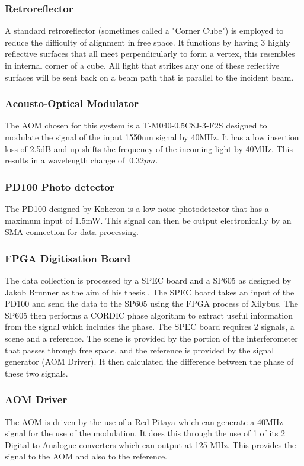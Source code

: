\documentclass[12pt,a4paper,oneside]{report}
\begin{document}
\subsubsection{Retroreflector}
A standard retroreflector (sometimes called a "Corner Cube") is employed to reduce the difficulty of alignment in free space. It functions by having 3 highly reflective surfaces that all meet perpendicularly to form a vertex, this resembles in internal corner of a cube. All light that strikes any one of these reflective surfaces will be sent back on a beam path that is parallel to the incident beam.

\subsubsection{Acousto-Optical Modulator}
The AOM \cite{Sell1550MODULATOR} chosen for this system is a  T-M040-0.5C8J-3-F2S designed to modulate the signal of the input 1550nm signal by 40MHz. It has a low insertion loss of 2.5dB and up-shifts the frequency of the incoming light by 40MHz. This results in a wavelength change of $~0.32pm$.

\subsubsection{PD100 Photo detector}
The PD100 designed by Koheron \cite{KoheronPD100Photodetector} is a low noise photodetector that has a maximum input of 1.5mW. This signal can then be output electronically by an SMA connection for data processing.

\subsubsection{FPGA Digitisation Board}
The data collection is processed by a SPEC board and a SP605 as designed by Jakob Brunner as the aim of his thesis \cite{Brunner2017}. The SPEC board takes an input of the PD100 and send the data to the SP605 using the FPGA process of Xilybus. The SP605 then performs a CORDIC phase algorithm to extract useful information from the signal which includes the phase. The SPEC board requires 2 signals, a scene and a reference. The scene is provided by the portion of the interferometer that passes through free space, and the reference is provided by the signal generator (AOM Driver). It then calculated the difference between the phase of these two signals.

\subsubsection{AOM Driver}
The AOM is driven by the use of a Red Pitaya \cite{Leban2014RedManual} which can generate a 40MHz signal for the use of the modulation. It does this through the use of 1 of its 2 Digital to Analogue converters which can output at 125 MHz. This provides the signal to the AOM and also to the reference.
\end{document}
